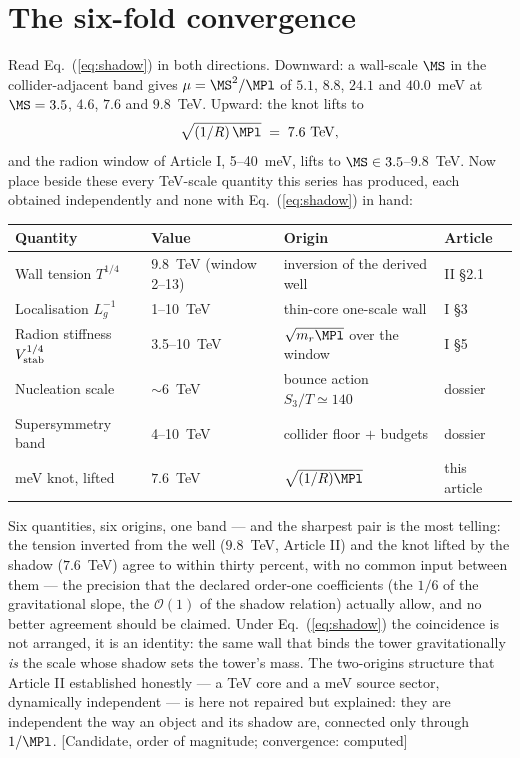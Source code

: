 \section{The six-fold convergence}
Read Eq.~(\ref{eq:shadow}) in both directions. Downward: a wall-scale $\MS$ in the collider-adjacent band gives $\mu=\MS^{2}/\MPl$ of $5.1$, $8.8$, $24.1$ and $40.0$~meV at $\MS=3.5$, $4.6$, $7.6$ and $9.8$~TeV. Upward: the knot lifts to
\begin{equation}
\sqrt{(1/R)\,\MPl}\;=\;7.6~\mathrm{TeV},
\end{equation}
and the radion window of Article I, 5--40~meV, lifts to $\MS\in3.5$--$9.8$~TeV. Now place beside these every TeV-scale quantity this series has produced, each obtained independently and none with Eq.~(\ref{eq:shadow}) in hand:
\begin{center}\small
\begin{tabular}{llll}
\toprule
\textbf{Quantity} & \textbf{Value} & \textbf{Origin} & \textbf{Article}\\
\midrule
Wall tension $T^{1/4}$ & $9.8$~TeV (window 2--13) & inversion of the derived well & II \S2.1\\
Localisation $L_{g}^{-1}$ & 1--10~TeV & thin-core one-scale wall & I \S3\\
Radion stiffness $V_{\rm stab}^{1/4}$ & 3.5--10~TeV & $\sqrt{m_{r}\MPl}$ over the window & I \S5\\
Nucleation scale & $\sim$6~TeV & bounce action $S_{3}/T\simeq140$ & dossier\\
Supersymmetry band & 4--10~TeV & collider floor $+$ budgets & dossier\\
meV knot, lifted & $7.6$~TeV & $\sqrt{(1/R)\MPl}$ & this article\\
\bottomrule
\end{tabular}
\end{center}
Six quantities, six origins, one band --- and the sharpest pair is the most telling: the tension inverted from the well ($9.8$~TeV, Article II) and the knot lifted by the shadow ($7.6$~TeV) agree to within thirty percent, with no common input between them --- the precision that the declared order-one coefficients (the $1/6$ of the gravitational slope, the $\mathcal{O}(1)$ of the shadow relation) actually allow, and no better agreement should be claimed. Under Eq.~(\ref{eq:shadow}) the coincidence is not arranged, it is an identity: the same wall that binds the tower gravitationally \emph{is} the scale whose shadow sets the tower's mass. The two-origins structure that Article II established honestly --- a TeV core and a meV source sector, dynamically independent --- is here not repaired but explained: they are independent the way an object and its shadow are, connected only through $1/\MPl$. [Candidate, order of magnitude; convergence: computed]

